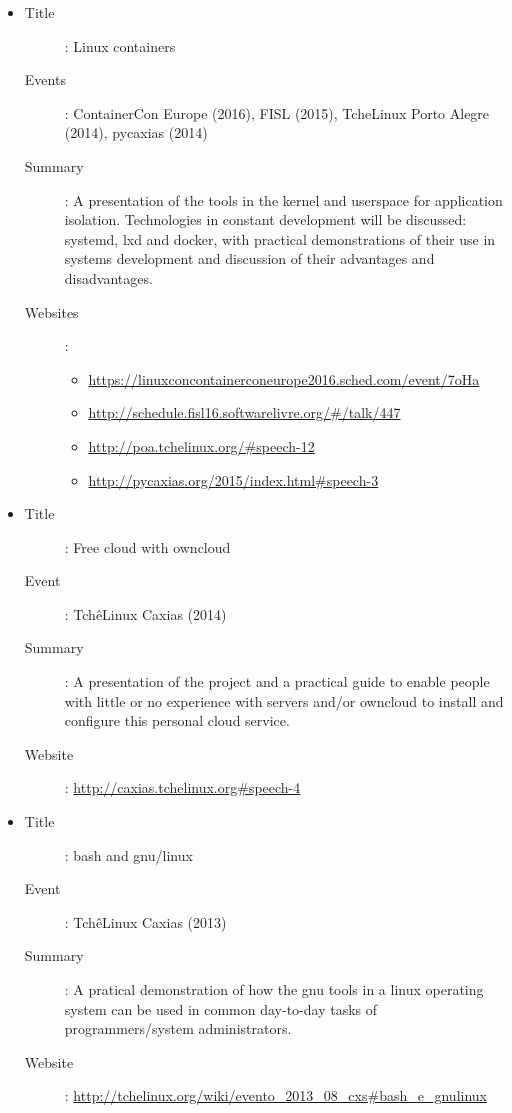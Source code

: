 \begin{itemize}
    \item
        \begin{description}
            \item[Title]: Linux containers
            \item[Events]:
                ContainerCon Europe (2016), FISL (2015), TcheLinux Porto Alegre
                (2014), pycaxias (2014)
            \item[Summary]:
                A presentation of the tools in the kernel and userspace for
                application isolation. Technologies in constant development
                will be discussed: systemd, lxd and docker, with practical
                demonstrations of their use in systems development and
                discussion of their advantages and disadvantages.
            \item[Websites]:
                \begin{itemize}
                    \item \url{https://linuxconcontainerconeurope2016.sched.com/event/7oHa}
                    \item \url{http://schedule.fisl16.softwarelivre.org/#/talk/447}
                    \item \url{http://poa.tchelinux.org/#speech-12}
                    \item \url{http://pycaxias.org/2015/index.html#speech-3}
                \end{itemize}
        \end{description}
    \item
        \begin{description}
            \item[Title]: Free cloud with owncloud
            \item[Event]: TchêLinux Caxias (2014)
            \item[Summary]:
                A presentation of the project and a practical guide to enable
                people with little or no experience with servers and/or
                owncloud to install and configure this personal cloud service.
            \item[Website]: \url{http://caxias.tchelinux.org#speech-4}
        \end{description}
    \item
        \begin{description}
            \item[Title]: bash and gnu/linux
            \item[Event]: TchêLinux Caxias (2013)
            \item[Summary]:
                A pratical demonstration of how the gnu tools in a linux
                operating system can be used in common day-to-day tasks of
                programmers/system administrators.
            \item[Website]:
                \url{http://tchelinux.org/wiki/evento_2013_08_cxs#bash_e_gnulinux}
        \end{description}
\end{itemize}

